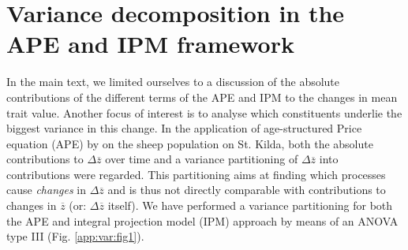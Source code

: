 \section{Variance decomposition in the APE and IPM framework}
\label{app:var}
In the main text, we limited ourselves to a discussion of the absolute contributions of the different terms of the APE and IPM to the changes in mean trait value. Another focus of interest is to analyse which constituents underlie the biggest variance in this change. In the application of age-structured Price equation (APE) by \cite{Ozgul2009} on the sheep population on St. Kilda, both the absolute contributions to $\Delta \overline z$ over time and a variance partitioning of $\Delta \overline z$ into contributions were regarded. This partitioning aims at finding which processes cause \textit{changes} in $\Delta \overline z$ and is thus not directly comparable with contributions to changes in $\overline z$ (or: $\Delta \overline z$ itself). We have performed a variance partitioning for both the APE and integral projection model (IPM) approach by means of an ANOVA type III (Fig. \ref{app:var:fig1}).

